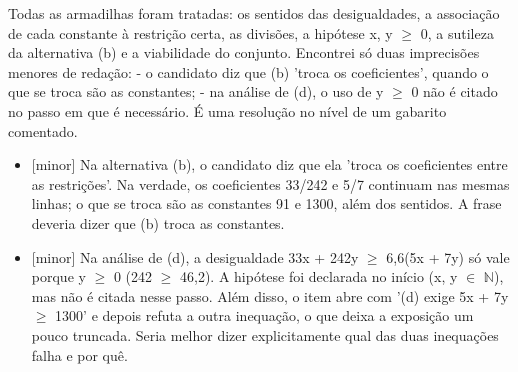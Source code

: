 \documentclass{article}%
\begin{document}
\newline%
Todas as armadilhas foram tratadas: os sentidos das desigualdades, a associação de cada constante à restrição certa, as divisões, a hipótese x, y $\geq$ 0, a sutileza da alternativa (b) e a viabilidade do conjunto.\newline%
\newline%
Encontrei só duas imprecisões menores de redação:\newline%
{-} o candidato diz que (b) 'troca os coeficientes', quando o que se troca são as constantes;\newline%
{-} na análise de (d), o uso de y $\geq$ 0 não é citado no passo em que é necessário.\newline%
\newline%
É uma resolução no nível de um gabarito comentado.%
\begin{itemize}%
\item%
{[}minor{]} Na alternativa (b), o candidato diz que ela 'troca os coeficientes entre as restrições'. Na verdade, os coeficientes 33/242 e 5/7 continuam nas mesmas linhas; o que se troca são as constantes 91 e 1300, além dos sentidos. A frase deveria dizer que (b) troca as constantes.%
\item%
{[}minor{]} Na análise de (d), a desigualdade 33x + 242y $\geq$ 6,6(5x + 7y) só vale porque y $\geq$ 0 (242 $\geq$ 46,2). A hipótese foi declarada no início (x, y $\in$ $\mathbb{N}$), mas não é citada nesse passo. Além disso, o item abre com '(d) exige 5x + 7y $\geq$ 1300' e depois refuta a outra inequação, o que deixa a exposição um pouco truncada. Seria melhor dizer explicitamente qual das duas inequações falha e por quê.%
\end{itemize}%
\end{document}
